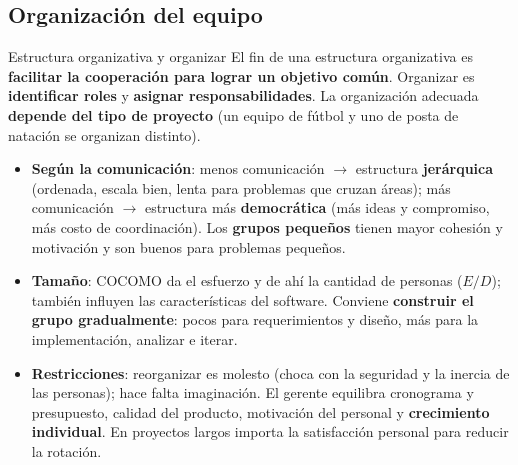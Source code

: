 \documentclass[11pt,a4paper]{article}
\begin{document}
\subsection{Organización del equipo}
\begin{defbox}{Estructura organizativa y organizar}
El fin de una estructura organizativa es \textbf{facilitar la cooperación para lograr un objetivo común}.
Organizar es \textbf{identificar roles} y \textbf{asignar responsabilidades}. La organización adecuada
\textbf{depende del tipo de proyecto} (un equipo de fútbol y uno de posta de natación se organizan distinto).
\end{defbox}
\begin{itemize}
  \item \textbf{Según la comunicación}: menos comunicación $\to$ estructura \textbf{jerárquica} (ordenada, escala
  bien, lenta para problemas que cruzan áreas); más comunicación $\to$ estructura más \textbf{democrática}
  (más ideas y compromiso, más costo de coordinación). Los \textbf{grupos pequeños} tienen mayor cohesión y motivación y son buenos para
  problemas pequeños.
  \item \textbf{Tamaño}: COCOMO da el esfuerzo y de ahí la cantidad de personas ($E/D$); también influyen las
  características del software. Conviene \textbf{construir el grupo gradualmente}: pocos para requerimientos y
  diseño, más para la implementación, analizar e iterar.
  \item \textbf{Restricciones}: reorganizar es molesto (choca con la seguridad y la inercia de las personas);
  hace falta imaginación. El gerente equilibra cronograma y presupuesto, calidad del producto, motivación del
  personal y \textbf{crecimiento individual}. En proyectos largos importa la satisfacción personal para reducir
  la rotación.
\end{itemize}
\end{document}

